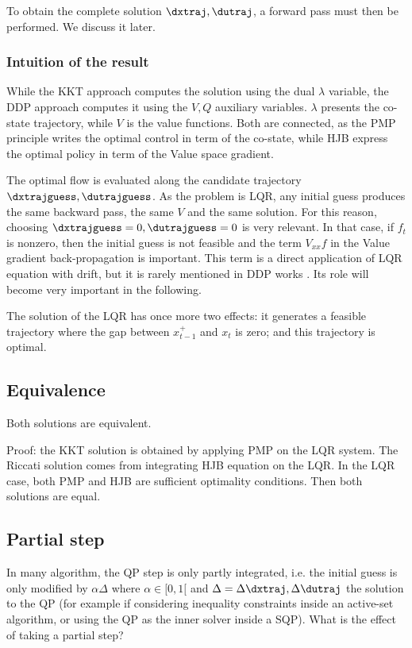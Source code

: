 \documentclass[10pt,a4paper]{article}
\begin{document}
To obtain the complete solution $\dxtraj,\dutraj$, a forward pass must then be performed.
We discuss it later.

\subsubsection{Intuition of the result}

While the KKT approach computes the solution using the dual $\lambda$ variable, the DDP approach computes it using the $V, Q$ auxiliary variables.
$\lambda$ presents the co-state trajectory, while $V$ is the value functions.
Both are connected, as the PMP principle writes the optimal control in term of the co-state, while HJB express the optimal policy in term of the Value space gradient.

The optimal flow is evaluated along the candidate trajectory $\dxtrajguess,\dutrajguess$.
As the problem is LQR, any initial guess produces the same backward pass, the same $V$ and the same solution.
For this reason, choosing $\dxtrajguess=0, \dutrajguess=0$ is very relevant.
In that case, if $f_t$ is nonzero, then the initial guess is not feasible and the term $V_{xx} f$ in the Value gradient back-propagation is important.
This term is a direct application of LQR equation with drift, but it is rarely mentioned in DDP works \cite{GiftthalerCoRR2017,LaineCoRR2018}.
Its role will become very important in the following.

The solution of the LQR has once more two effects: it generates a feasible trajectory where the gap between $x_{t-1}^+$ and $x_t$ is zero; and this trajectory is optimal.

\subsection{Equivalence}

Both solutions are equivalent.

Proof: the KKT solution is obtained by applying PMP on the LQR system. The Riccati solution comes from integrating HJB equation on the LQR. In the LQR case, both PMP and HJB are sufficient optimality conditions. Then both solutions are equal.

\subsection{Partial step}

In many algorithm, the QP step is only partly integrated, i.e. the initial guess is only modified by $\alpha \Delta$ where $\alpha \in [0,1[$ and $\Delta = \Delta \dxtraj,\Delta \dutraj$ the solution to the QP (for example if considering inequality constraints inside an active-set algorithm, or using the QP as the inner solver inside a SQP).
What is the effect of taking a partial step?
\end{document}
